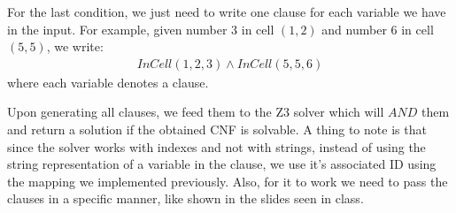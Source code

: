 \documentclass[12pt,a4paper]{article}
\begin{document}
For the last condition, we just need to write one clause for each variable we have in the input. For example, given number 3 in cell $(1,2)$ and number 6 in cell $(5,5)$, we write:
\begin{align*}
  InCell(1,2,3) \wedge InCell(5,5,6)
\end{align*}
where each variable denotes a clause.

\medskip

Upon generating all clauses, we feed them to the Z3 solver which will $AND$ them and return a solution if the obtained CNF is solvable.
A thing to note is that since the solver works with indexes and not with strings, instead of using the string representation of a variable in the clause, we use it's associated ID using the mapping we implemented previously.
Also, for it to work we need to pass the clauses in a specific manner, like shown in the slides seen in class.
\end{document}
